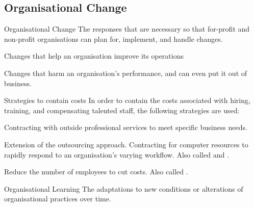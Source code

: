 \documentclass[\main/notes.tex]{subfiles}
\begin{document}
			\subsection{Organisational Change}
				\begin{definition}{Organisational Change}
					The responses that are necessary so that for-profit and non-profit organisations can plan for, implement, and handle changes.
					\begin{description}[nosep]
						\item[Sustaining Change] Changes that help an organisation improve its operations
						\item[Disruptive Change] Changes that harm an organisation's performance, and can even put it out of business.
					\end{description}
				\end{definition}
				\begin{sidenote}{Strategies to contain costs}
					In order to contain the costs associated with hiring, training, and compensating talented staff, the following strategies are used:
					\begin{description}[nosep]
						\item[Outsourcing] Contracting with outside professional services to meet specific business needs.
						\item[On-demand computing] Extension of the outsourcing approach. Contracting for computer resources to rapidly respond to an organisation's varying workflow. Also called  and .
						\item[Downsizing] Reduce the number of employees to cut costs. Also called .
					\end{description}
				\end{sidenote}
				\begin{definition}{Organisational Learning}
					The adaptations to new conditions or alterations of organisational practices over time.
				\end{definition}
\end{document}
